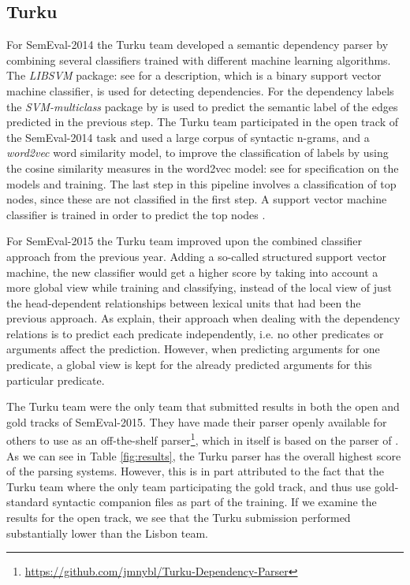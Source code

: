 \subsection{Turku}

For SemEval-2014 the Turku team developed a semantic dependency parser by combining several classifiers trained with different machine learning algorithms. The \textit{LIBSVM} package: see  for a description, which is a binary support vector machine classifier, is used for detecting dependencies. For the dependency labels the \textit{SVM-multiclass} package by  is used to predict the semantic label of the edges predicted in the previous step. The Turku team participated in the open track of the SemEval-2014 task and used a large corpus of syntactic n-grams, and a \textit{word2vec} word similarity model, to improve the classification of labels by using the cosine similarity measures in the word2vec model: see  for specification on the models and training. The last step in this pipeline involves a classification of top nodes, since these are not classified in the first step. A support vector machine classifier is trained in order to predict the top nodes \cite{Kanerva:Turku:14}. 

For SemEval-2015 the Turku team improved upon the combined classifier approach from the previous year. Adding a so-called structured support vector machine, the new classifier would get a higher score by taking into account a more global view while training and classifying, instead of the local view of just the head-dependent relationships between lexical units that had been the previous approach. As  explain, their approach when dealing with the dependency relations is to predict each predicate independently, i.e. no other predicates or arguments affect the prediction. However, when predicting arguments for one predicate, a global view is kept for the already predicted arguments for this particular predicate. 

The Turku team were the only team that submitted results in both the open and gold tracks of SemEval-2015. They have made their parser openly available for others to use as an off-the-shelf parser\footnote{\url{https://github.com/jmnybl/Turku-Dependency-Parser}}, which in itself is based on the parser of . As we can see in Table \ref{fig:results}, the Turku parser has the overall highest score of the parsing systems. However, this is in part attributed to the fact that the Turku team where the only team participating the gold track, and thus use gold-standard syntactic companion files as part of the training. If we examine the results for the open track, we see that the Turku submission performed substantially lower than the Lisbon team. 

